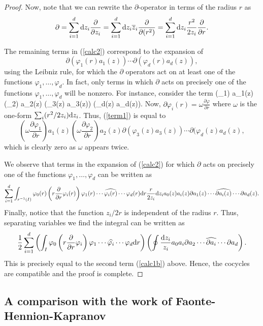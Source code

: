 \begin{proof}
Now, note that we can rewrite the $\partial$-operator in terms of the radius $r$ as
\begin{align*}
\partial = \sum_{i=1}^d {\rm d} z_i \frac{\partial}{\partial z_i} = \sum_{i=1}^d {\rm d} z_i \overline{z}_i \frac{\partial}{\partial (r^2)} = \sum_{i=1}^d {\rm d} z_i \frac{r^2}{2 z_i} \frac{\partial}{\partial r} .
\end{align*}

The remaining terms in (\ref{calc2}) correspond to the expansion of
\[
\partial(\varphi_1(r) a_1(z)) \cdots \partial(\varphi_d(r) a_d(z)),
\]
using the Leibniz rule, for which the $\partial$ operators act on at least one of the functions $\varphi_1,\ldots,\varphi_d$. In fact, only terms in which $\partial$ acts on precisely one of the functions $\varphi_1,\ldots, \varphi_d$ will be nonzero. For instance, consider the term
\beqn\label{term1}
(\partial \varphi_1) a_1(z) (\partial \varphi_2) a_2(z) \partial(\varphi_3(z) a_3(z)) \cdots \partial(\varphi_d(z) a_d(z)).
\eeqn
Now, $\partial \varphi_i(r) = \omega \frac{\partial \varphi}{\partial r}$ where $\omega$ is the one-form $\sum_i (r^2 / 2 z_i) {\rm d} z_i$. Thus, (\ref{term1}) is equal to
\[
\left(\omega \frac{\partial \varphi_1}{\partial r} \right) a_1(z) \left(\omega \frac{\partial \varphi_2}{\partial r}  \right) a_2(z) \partial(\varphi_3(z) a_3(z)) \cdots \partial(\varphi_d(z) a_d(z),
\]
which is clearly zero as $\omega$ appears twice.

We observe that terms in the expansion of (\ref{calc2}) for which $\partial$ acts on precisely one of the functions $\varphi_1,\ldots,\varphi_d$ can be written as
\[
\sum_{i=1}^d \int_{r^{-1}(I)} \varphi_0(r)\left(r \frac{\partial}{\partial r} \varphi_i(r)\right) \varphi_1(r) \cdots \widehat{\varphi_i(r)} \cdots \varphi_d(r) {\rm d} r \frac{r}{2 z_i} {\rm d} z_i a_0(z) a_i(z) \partial a_1(z) \cdots \widehat{\partial a_i(z)} \cdots \partial a_d(z) .
\] 
Finally, notice that the function $z_i / 2r$ is independent of the radius $r$. Thus, separating variables we find the integral can be written as
\[
\frac{1}{2} \sum_{i=1}^d \left(\int_{I} \varphi_0 \left(r \frac{\partial}{\partial r} \varphi_i \right) \varphi_1 \cdots \widehat{\varphi_i } \cdots \varphi_d {\rm d} r\right) \left(\oint \frac{{\rm d} z_i}{z_i} a_0 a_i \partial a_2 \cdots \widehat{\partial a_i} \cdots \partial a_d \right) .
\]
This is precisely equal to the second term (\ref{calc1b}) above. Hence, the cocycles are compatible and the proof is complete. 
\end{proof}

\subsection{A comparison with the work of Faonte-Hennion-Kapranov}

